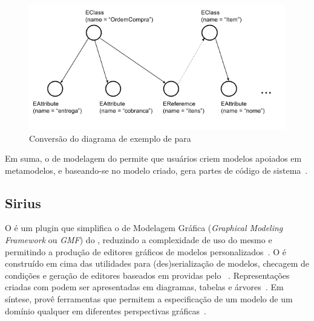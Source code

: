 \begin{figure}[h]
	\centering
	\includegraphics[width=1\textwidth]{figuras/exemplos-emf/uml-to-ecore.png}
	\caption{Conversão do diagrama de exemplo de \uml para \ecore}
	\label{exemplo-uml-to-ecore}
\end{figure}

Em suma, o \framework de modelagem do \eclipse permite que usuários criem modelos apoiados em metamodelos, e baseando-se no modelo criado, gera partes de código de sistema~\cite{vujovic2014comparative}.


\subsection{Sirius}

O \sirius é um plugin que simplifica o \framework de Modelagem Gráfica (\textit{Graphical Modeling Framework} ou \textit{GMF}) do \eclipse, reduzindo a complexidade de uso do mesmo e permitindo a produção de editores gráficos de modelos personalizados~\cite{viyovic2014sirius}. O \sirius é construído em cima das utilidades para (des)serialização de modelos, checagem de condições e geração de editores baseados em \ecore providas pelo \eclipse~\cite{budinsky2004eclipse}. Representações criadas com \sirius podem ser apresentadas em diagramas, tabelas e árvores~\cite{viyovic2014sirius}. Em síntese, \sirius provê ferramentas que permitem a especificação de um modelo de um domínio qualquer em diferentes perspectivas gráficas~\cite{vujovic2014comparative}.

